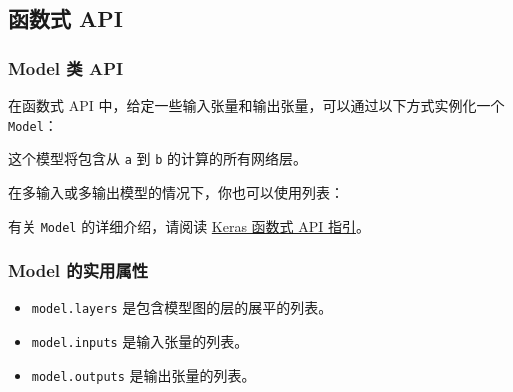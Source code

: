 \subsection{函数式 API}\label{model-api}
\subsubsection{Model 类 API}

在函数式 API 中，给定一些输入张量和输出张量，可以通过以下方式实例化一个
\texttt{Model}：

\begin{Shaded}
\begin{Highlighting}[]
  
  

\OperatorTok{=} \OperatorTok{=}\NormalTok{(}\NormalTok{,))}
\OperatorTok{=} 
\OperatorTok{=} \OperatorTok{=}\OperatorTok{=}
\end{Highlighting}
\end{Shaded}

这个模型将包含从 \texttt{a} 到 \texttt{b} 的计算的所有网络层。

在多输入或多输出模型的情况下，你也可以使用列表：

\begin{Shaded}
\begin{Highlighting}[]
\OperatorTok{=} \OperatorTok{=}\OperatorTok{=}\NormalTok{[b1, b3, b3])}
\end{Highlighting}
\end{Shaded}

有关 \texttt{Model} 的详细介绍，请阅读
\hyperref[functional-api-guide]{Keras 函数式 API 指引}。

\subsubsection{Model
的实用属性}

\begin{itemize}
\tightlist
\item
  \texttt{model.layers} 是包含模型图的层的展平的列表。
\item
  \texttt{model.inputs} 是输入张量的列表。
\item
  \texttt{model.outputs} 是输出张量的列表。
\end{itemize}

